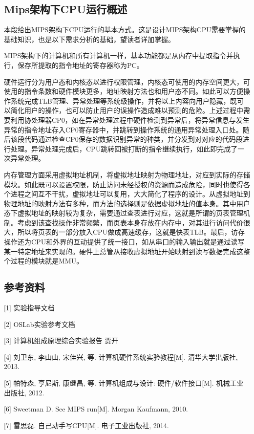 \subsection{Mips架构下CPU运行概述}
本段给出MIPS架构下CPU运行的基本方式。这是设计MIPS架构CPU需要掌握的基础知识，也是以下需求分析的基础，望读者详加掌握。

MIPS架构下的计算机和所有计算机一样，基本功能都是从内存中提取指令并执行，保存所提取的指令地址的寄存器称为PC。

硬件运行分为用户态和内核态以进行权限管理，内核态可使用的内存空间更大，可使用的指令条数和硬件模块更多，地址映射方法也和用户态不同。如此可以方便操作系统完成TLB管理、异常处理等系统级操作，并将以上内容向用户隐藏，既可以简化用户的操作，也可以防止用户的误操作造成难以预测的危险。上述过程中需要利用协处理器CP0，如在异常处理过程中硬件检测到异常后，将异常信息与发生异常的指令地址存入CP0寄存器中，并跳转到操作系统的通用异常处理入口处。随后该段代码通过检查CP0保存的数据识别异常的种类，并分发到对对应的代码段进行处理。异常处理完成后，CPU跳转回被打断的指令继续执行，如此即完成了一次异常处理。

内存管理方面采用虚拟地址机制，将虚拟地址映射为物理地址，对应到实际的存储模块。如此既可以设置权限，防止访问未经授权的资源而造成危险，同时也使得各个进程之间互不干扰，虚拟地址可以复用，大大简化了程序的设计。从虚拟地址到物理地址的映射方法有多种，而方法的选择则是依据虚拟地址的值本身。其中用户态下虚拟地址的映射较为复杂，需要通过查表进行对应，这就是所谓的页表管理机制。考虑到该查找操作非常频繁，而页表本身存放在内存中，对其进行访问代价很大，所以将页表的一部分放入CPU做成高速缓存，这就是快表TLB。最后，访存操作还为CPU和外界的互动提供了统一接口，如从串口的输入输出就是通过读写某一特定地址来实现的。硬件上总管从接收虚拟地址开始映射到读写数据完成这整个过程的模块就是MMU。

\subsection{参考资料}
[1] 实验指导文档

[2] OSLab实验参考文档
	
[3] 计算机组成原理综合实验报告 贾开

[4] 刘卫东, 李山山, 宋佳兴, 等. 计算机硬件系统实验教程[M]. 清华大学出版社, 2013.
	
[5] 帕特森, 亨尼斯, 康继昌, 等. 计算机组成与设计: 硬件/软件接口[M]. 机械工业出版社, 2012.
	
[6] Sweetman D. See MIPS run[M]. Morgan Kaufmann, 2010.

[7] 雷思磊. 自己动手写CPU[M]. 电子工业出版社, 2014.
